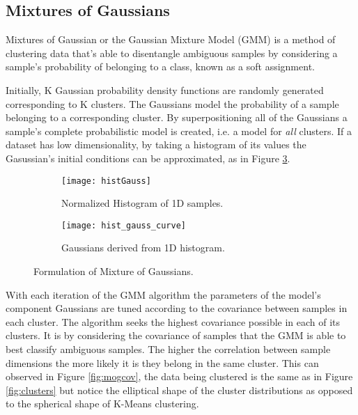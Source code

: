  \subsection{Mixtures of Gaussians}

Mixtures of Gaussian or the Gaussian Mixture Model (GMM) is a method of clustering data that's able to disentangle ambiguous samples by considering a sample's probability of belonging to a class, known as a soft assignment. 

Initially, K Gaussian probability density functions are randomly generated corresponding to K clusters. The Gaussians model the probability of a sample belonging to a corresponding cluster. By superpositioning all of the Gaussians a sample's complete probabilistic model is created, i.e. a model for \emph{all} clusters. If a dataset has low dimensionality, by taking a histogram of its values the Gasussian's initial conditions can be approximated, as in Figure \ref{fig:mixture}.

\begin{figure}[H]
	\centering
	\begin{subfigure}[b]{0.5\linewidth}
            \centering\texttt{[image: histGauss]}
      		\caption{Normalized Histogram of 1D samples.}
		\label{fig:histGauss}
    	\end{subfigure}%
    	\begin{subfigure}[b]{0.5\linewidth}
      		\centering\texttt{[image: hist\_gauss\_curve]}
      		\caption{Gaussians derived from 1D histogram. }
       		\label{fig:histCurve}
		\end{subfigure}
		\caption{Formulation of Mixture of Gaussians.}
    	\label{fig:mixture}
\end{figure}

With each iteration of the GMM algorithm the parameters of the model's component Gaussians are tuned according to the covariance between samples in each cluster. The algorithm seeks the highest covariance possible in each of its clusters. It is by considering the covariance of samples that the GMM is able to best classify ambiguous samples. The higher the correlation between sample dimensions the more likely it is they belong in the same cluster. This can observed in Figure \ref{fig:mogcov}, the data being clustered is the same as in Figure \ref{fig:clusters} but notice the elliptical shape of the cluster distributions as opposed to the spherical shape of K-Means clustering.




